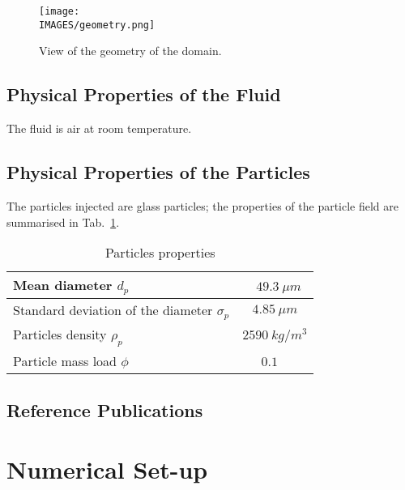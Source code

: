 \newpage
\begin{figure}[H]
\centerline{\texttt{[image: \\IMAGES/geometry.png]}}
\caption{{View of the geometry of the domain.}}
\label{geodom}
\end{figure}

\subsection{Physical Properties of the Fluid}

The fluid is air at room temperature.


\subsection{Physical Properties of the Particles }

The particles injected are glass particles; the properties of the particle field are summarised in Tab.~\ref{tabpart}.

\begin{table}[H]
\begin{center}
\begin{tabular}{|l|c|} \hline
Mean diameter $d_{p}$                   &  \  $49.3~\mu m$         \\ \hline
Standard deviation of the diameter $\sigma_{p}$    &    $4.85~\mu m$          \\ \hline
Particles density $\rho_{p}$                 &    $2590~kg/m^{3}$       \\ \hline
Particle mass load $\phi$  \    &    $0.1$              \  \\ \hline
\end{tabular}
\end{center}
\caption{Particles properties}
\label{tabpart}
\end{table}


\subsection{Reference Publications}



\section{Numerical Set-up}


